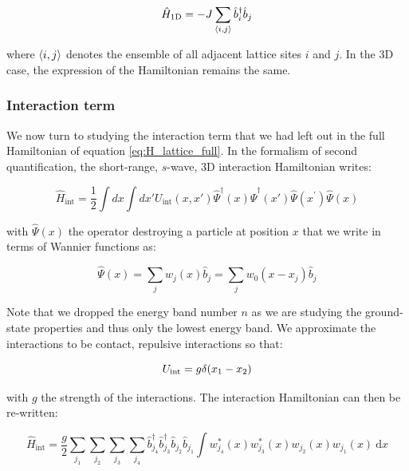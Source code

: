 \begin{equation}
    \hat{H}_{\rm{1D}} = -J \sum_{\left\langle i,j\right\rangle} \hat{b}^{\dagger}_i \hat{b}_j
    \label{eq:H_band}
\end{equation}

\noindent where $\left\langle i,j\right\rangle$ denotes the ensemble of all adjacent lattice sites $i$ and $j$. In the 3D case, the expression of the Hamiltonian remains the same.

\subsubsection{Interaction term}
We now turn to studying the interaction term that we had left out in the full Hamiltonian of equation \ref{eq:H_lattice_full}. In the formalism of second quantification, the short-range, $s$-wave, 3D interaction Hamiltonian writes:

\begin{equation}
    \hat{H}_{\mathrm{int}}=\frac{1}{2} \int d x \int d x' U_{\mathrm{int}}\left(x, x'\right) \hat{\Psi}^{\dagger}(x) \hat{\Psi}^{\dagger}\left(x'\right) \hat{\Psi}\left(x^{\prime}\right) \hat{\Psi}(x)
\end{equation}

\noindent with $\hat{\Psi}(x)$ the operator destroying a particle at position $x$ that we write in terms of Wannier functions as:

\begin{equation}
    \hat{\Psi}(x)=\sum_{j} w_{j}(x) \hat{b}_{j} = \sum_{j} w_{0}(x-x_j) \hat{b}_{j} 
    \label{eq:atom_operator_lattice}
\end{equation}

\noindent Note that we dropped the energy band number $n$ as we are studying the ground-state properties and thus only the lowest energy band. We approximate the interactions to be contact, repulsive interactions so that:

\begin{equation}
    U_{\rm{int}}= g \delta (x_1 - x_2)
\end{equation}

\noindent with $g$ the strength of the interactions. The interaction Hamiltonian can then be re-written:

\begin{equation}
    \hat{H}_{\mathrm{int}}=\frac{g}{2} \sum_{j_{1}} \sum_{j_{2}} \sum_{j_{3}} \sum_{j_{4}} \hat{b}_{j_{4}}^{\dagger} \hat{b}_{j_{3}}^{\dagger} \hat{b}_{j_{2}} \hat{b}_{j_{1}} \int w_{j_{4}}^{*}(x) w_{j_{3}}^{*}(x) w_{j_{2}}(x) w_{j_{1}}(x) \mathrm{~d} x
    \label{eq:h_int_intermediate}
\end{equation}

